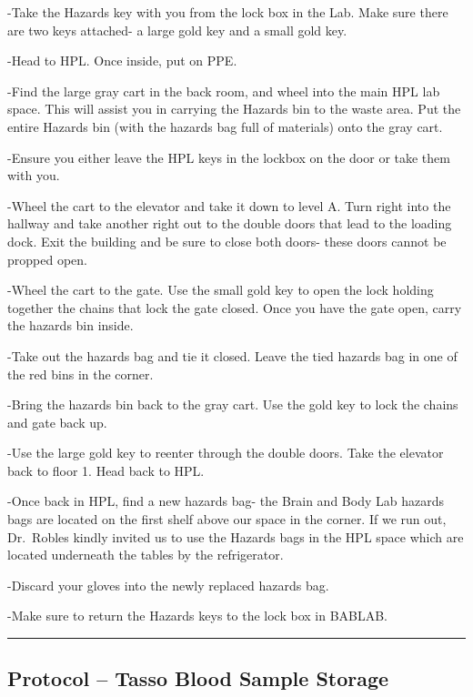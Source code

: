 \documentclass[]{book}
\begin{document}
-Take the Hazards key with you from the lock box in the Lab. Make sure there are two keys attached- a large gold key and a small gold key.

-Head to HPL. Once inside, put on PPE.

-Find the large gray cart in the back room, and wheel into the main HPL lab space. This will assist you in carrying the Hazards bin to the waste area. Put the entire Hazards bin (with the hazards bag full of materials) onto the gray cart.

-Ensure you either leave the HPL keys in the lockbox on the door or take them with you.

-Wheel the cart to the elevator and take it down to level A. Turn right into the hallway and take another right out to the double doors that lead to the loading dock. Exit the building and be sure to close both doors- these doors cannot be propped open.

-Wheel the cart to the gate. Use the small gold key to open the lock holding together the chains that lock the gate closed. Once you have the gate open, carry the hazards bin inside.

-Take out the hazards bag and tie it closed. Leave the tied hazards bag in one of the red bins in the corner.

-Bring the hazards bin back to the gray cart. Use the gold key to lock the chains and gate back up.

-Use the large gold key to reenter through the double doors. Take the elevator back to floor 1. Head back to HPL.

-Once back in HPL, find a new hazards bag- the Brain and Body Lab hazards bags are located on the first shelf above our space in the corner. If we run out, Dr.~Robles kindly invited us to use the Hazards bags in the HPL space which are located underneath the tables by the refrigerator.

-Discard your gloves into the newly replaced hazards bag.

-Make sure to return the Hazards keys to the lock box in BABLAB.

\begin{center}\rule{0.5\linewidth}{0.5pt}\end{center}

\hypertarget{protocol-tasso-blood-sample-storage}{%
\subsection{Protocol -- Tasso Blood Sample Storage}\label{protocol-tasso-blood-sample-storage}}
\end{document}
